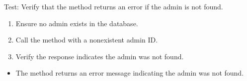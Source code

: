 \documentclass[letterpaper,10pt,english]{sphinxmanual}
\begin{document}
\begin{fulllineitems}
\label{\detokenize{test:test.test_admin.test_update_admin_name_not_found}}
\pysigstartsignatures
\pysiglinewithargsret
{}
{}
{}
\pysigstopsignatures
\sphinxAtStartPar
Test: Verify that the method returns an error if the admin is not found.
\begin{description}
\begin{enumerate}
%
\item {} 
\sphinxAtStartPar
Ensure no admin exists in the database.

\item {} 
\sphinxAtStartPar
Call the  method with a non\sphinxhyphen{}existent admin ID.

\item {} 
\sphinxAtStartPar
Verify the response indicates the admin was not found.

\end{enumerate}

\begin{itemize}
\item {} 
\sphinxAtStartPar
The method returns an error message indicating the admin was not found.

\end{itemize}

\end{description}

\end{fulllineitems}

\end{document}
